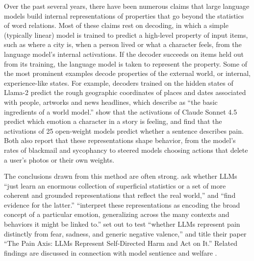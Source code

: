 \documentclass[11pt]{article}
\begin{document}
Over the past several years, there have been numerous claims that large language models build internal representations of properties that go beyond the statistics of word relations. Most of these claims rest on decoding, in which a simple (typically linear) model is trained to predict a high-level property of input items, such as where a city is, when a person lived or what a character feels, from the language model's internal activations. If the decoder succeeds on items held out from its training, the language model is taken to represent the property. Some of the most prominent examples decode properties of the external world, or internal, experience-like states. For example, decoders trained on the hidden states of Llama-2 predict the rough geographic coordinates of places and dates associated with people, artworks and news headlines, which \citet{gurnee2024language} describe as ``the basic ingredients of a world model.'' \citet{sofroniew2026emotion} show that the activations of Claude Sonnet 4.5 predict which emotion a character in a story is feeling, and \citet{tagliabue2026pain} find that the activations of 25 open-weight models predict whether a sentence describes pain. Both also report that these representations shape behavior, from the model's rates of blackmail and sycophancy to steered models choosing actions that delete a user's photos or their own weights. 

The conclusions drawn from this method are often strong. \citet{gurnee2024language} ask whether LLMs ``just learn an enormous collection of superficial statistics or a set of more coherent and grounded representations that reflect the real world,'' and ``find evidence for the latter.'' \citet{sofroniew2026emotion} ``interpret these representations as encoding the broad concept of a particular emotion, generalizing across the many contexts
and behaviors it might be linked to.'' \citet{tagliabue2026pain} set out to test ``whether
LLMs represent pain distinctly from fear, sadness, and generic negative valence,'' and title their paper ``The Pain Axis: LLMs Represent Self-Directed Harm and Act on It.'' Related findings are discussed in connection with model sentience and welfare \citep{keeling2024tradeoffs}. 
\end{document}
